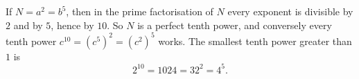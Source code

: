 If $N=a^2=b^5$, then in the prime factorisation of $N$ every exponent is divisible by $2$ and by $5$, hence by $10$. So $N$ is a perfect tenth power, and conversely every tenth power $c^{10}=(c^5)^2=(c^2)^5$ works. The smallest tenth power greater than $1$ is
\[
2^{10}=\boxed{1024}=32^2=4^5 .
\]
